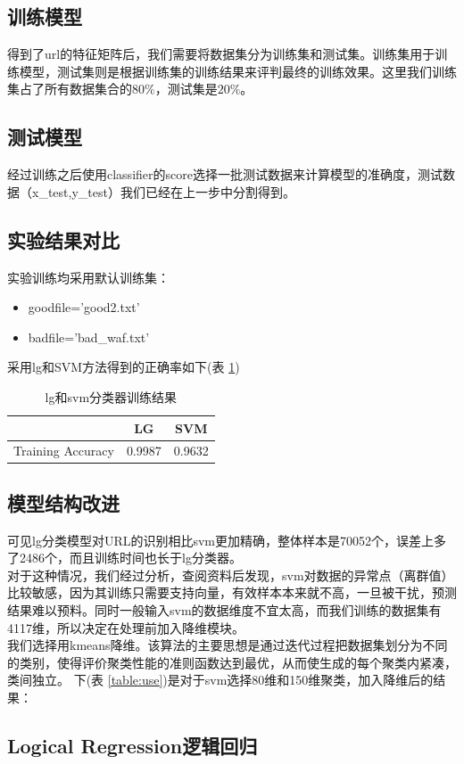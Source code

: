 \subsection{训练模型}
得到了url的特征矩阵后，我们需要将数据集分为训练集和测试集。训练集用于训练模型，测试集则是根据训练集的训练结果来评判最终的训练效果。这里我们训练集占了所有数据集合的$80\%$，测试集是$20\%$。
\subsection{测试模型}
经过训练之后使用classifier的score选择一批测试数据来计算模型的准确度，测试数据（x\_test,y\_test）我们已经在上一步中分割得到。
\subsection{实验结果对比}
实验训练均采用默认训练集：
\begin{itemize}
    \item goodfile='good2.txt'
    \item badfile='bad\_waf.txt'
\end{itemize}
采用lg和SVM方法得到的正确率如下(表 \ref{table:no_keams})
\begin{table}[!ht]
    \caption{lg和svm分类器训练结果}
    \centering
    \label{table:no_keams}    
    \begin{tabular}{|c|c|c|}
        \hline
        &LG&SVM\\
        \hline
        Training Accuracy&0.9987&0.9632\\
        \hline
    \end{tabular}
\end{table}
\subsection{模型结构改进}
可见lg分类模型对URL的识别相比svm更加精确，整体样本是70052个，误差上多了2486个，而且训练时间也长于lg分类器。
\\\indent{}对于这种情况，我们经过分析，查阅资料后发现，svm对数据的异常点（离群值）比较敏感，因为其训练只需要支持向量，有效样本本来就不高，一旦被干扰，预测结果难以预料。同时一般输入svm的数据维度不宜太高，而我们训练的数据集有4117维，所以决定在处理前加入降维模块。 
\\\indent{}我们选择用kmeans降维。该算法的主要思想是通过迭代过程把数据集划分为不同的类别，使得评价聚类性能的准则函数达到最优，从而使生成的每个聚类内紧凑，类间独立。 
下(表 \ref{table:use})是对于svm选择80维和150维聚类，加入降维后的结果： 

\subsection{Logical Regression逻辑回归}
